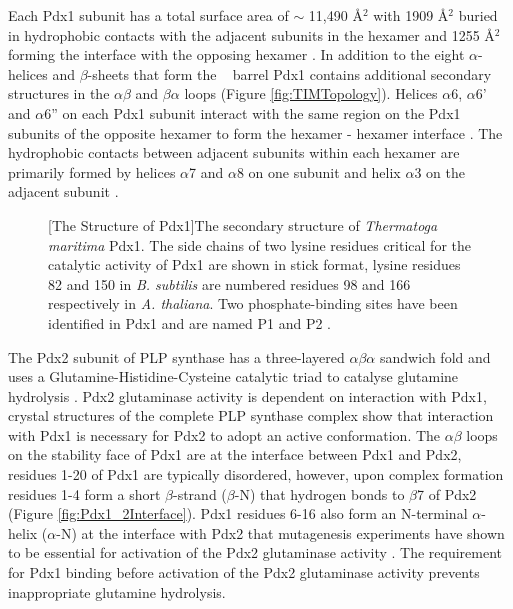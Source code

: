 Each Pdx1 subunit has a total surface area of $\sim$ 11,490 \si{\angstrom}$^2$ with 1909 \si{\angstrom}$^2$ buried in hydrophobic contacts with the adjacent subunits in the hexamer and 1255 \si{\angstrom}$^2$ forming the interface with the opposing hexamer \cite{Zhu2005}. In addition to the eight $\alpha$-helices and $\beta$-sheets that form the \TIM~ barrel Pdx1 contains additional secondary structures in the $\alpha\beta$ and $\beta\alpha$ loops (Figure \ref{fig:TIMTopology}). Helices $\alpha$6, $\alpha$6' and $\alpha$6'' on each Pdx1 subunit interact with the same region on the Pdx1 subunits of the opposite hexamer to form the hexamer - hexamer interface \cite{Zhu2005,Strohmeier2006}. The hydrophobic contacts between adjacent subunits within each hexamer are primarily formed by helices $\alpha$7 and $\alpha$8 on one subunit and helix $\alpha$3 on the adjacent subunit \cite{Strohmeier2006}.        
		
\begin{figure}[!htbp]
\begin{minipage}{\linewidth}

	[The Structure of Pdx1]{The secondary structure of \textit{Thermatoga maritima} Pdx1. The side chains of two lysine residues critical for the catalytic activity of Pdx1 are shown in stick format, lysine residues 82 and 150 in \textit{B. subtilis} are numbered residues 98 and 166 respectively in \textit{A. thaliana}. Two phosphate-binding sites have been identified in Pdx1 and are named P1 and P2 \cite{Zein2006}.\linebreak \label{fig:TMPdx1}}	
\end{minipage} 
\end{figure}

The Pdx2 subunit of PLP synthase has a three-layered $\alpha\beta\alpha$ sandwich fold and uses a Glutamine-Histidine-Cysteine catalytic triad to catalyse glutamine hydrolysis \cite{Bauer2004,Gengenbacher2006}. Pdx2 glutaminase activity is dependent on interaction with Pdx1, crystal structures of the complete PLP synthase complex show that interaction with Pdx1 is necessary for Pdx2 to adopt an active conformation\cite{Wrenger2005,Strohmeier2006}. The $\alpha\beta$ loops on the stability face of Pdx1 are at the interface between Pdx1 and Pdx2, residues 1-20 of Pdx1 are typically disordered, however, upon complex formation residues 1-4 form a short $\beta$-strand ($\beta$-N) that hydrogen bonds to $\beta$7 of Pdx2 (Figure \ref{fig:Pdx1_2Interface}). Pdx1 residues 6-16 also form an N-terminal $\alpha$-helix ($\alpha$-N) at the interface with Pdx2 that mutagenesis experiments have shown to be essential for activation of the Pdx2 glutaminase activity \cite{Wallner2009}. The requirement for Pdx1 binding before activation of the Pdx2 glutaminase activity prevents inappropriate glutamine hydrolysis.

